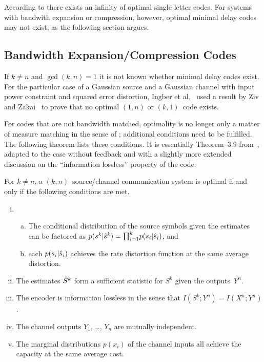 According to  there exists an infinity of optimal
single letter codes. For systems with bandwith expansion or compression,
however, optimal minimal delay codes may not exist, as the following section
argues.


\subsection{Bandwidth Expansion/Compression Codes}

If $k \ne n$ and $\gcd(k,n) = 1$ it is not known whether minimal delay codes
exist.  For the particular case of a Gaussian source and a Gaussian channel with
input power constraint and squared error distortion, Ingber et
al.~\cite{IngberLZF2008} used a result by Ziv and Zakai~\cite{ZivZ1973} to prove
that no optimal $(1,n)$ or $(k,1)$~code exists.

For codes that are not bandwidth matched, optimality is no longer only a matter
of measure matching in the sense of ; additional conditions
need to be fulfilled. The following theorem lists these conditions. It is
essentially Theorem~3.9 from~\cite{GastparThesis}, adapted to the case without
feedback and with a slightly more extended discussion on the ``information
lossless'' property of the code. 

\begin{theorem}
  \label{thm:tcntc1n}
  For $k \ne n$, a $(k, n)$~source/channel communication system is optimal if
  and only if the following conditions are met.
  \begin{enumerate}[(i)]
    \item
      \begin{enumerate}[(a)]
        \item The conditional distribution of the source symbols given the
          estimates can be factored as $p(s^k|{\hat{s}}^k) = {\prod_{i=1}^k} p(s_i|{\hat{s}}_i)$, and
        \item each $p(s_i|{\hat{s}}_i)$ achieves the rate distortion function at the
          same average distortion.
      \end{enumerate}

    \item The estimates ${\hat{S}}^k$ form a sufficient statistic for $S^k$ given the
      outputs~$Y^n$.

    \item The encoder is information lossless in the sense that $I(S^k; Y^n) =
      I(X^n; Y^n)$. 

    \item The channel outputs $Y_1$, \ldots, $Y_n$ are mutually independent.

    \item The marginal distributions $p(x_i)$ of the channel inputs all achieve
      the capacity at the same average cost.
  \end{enumerate}
\end{theorem}

